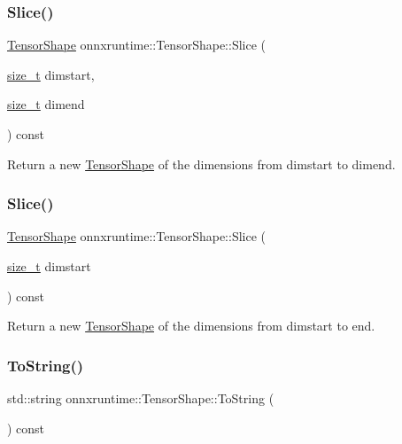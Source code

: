 \subsubsection{\texorpdfstring{Slice()}{Slice()}\hspace{0.1cm}{\footnotesize\ttfamily [1/2]}}
{\footnotesize\ttfamily \mbox{\hyperlink{classonnxruntime_1_1TensorShape}{Tensor\+Shape}} onnxruntime\+::\+Tensor\+Shape\+::\+Slice (\begin{DoxyParamCaption}\item[{\mbox{\hyperlink{mlasi_8h_a503efbc1c6e50825320ad909366b78ab}{size\+\_\+t}}}]{dimstart,  }\item[{\mbox{\hyperlink{mlasi_8h_a503efbc1c6e50825320ad909366b78ab}{size\+\_\+t}}}]{dimend }\end{DoxyParamCaption}) const}

Return a new \mbox{\hyperlink{classonnxruntime_1_1TensorShape}{Tensor\+Shape}} of the dimensions from dimstart to dimend. \mbox{\label{classonnxruntime_1_1TensorShape_aa4a71819ef5121d26e404e2efd022623}} 
\subsubsection{\texorpdfstring{Slice()}{Slice()}\hspace{0.1cm}{\footnotesize\ttfamily [2/2]}}
{\footnotesize\ttfamily \mbox{\hyperlink{classonnxruntime_1_1TensorShape}{Tensor\+Shape}} onnxruntime\+::\+Tensor\+Shape\+::\+Slice (\begin{DoxyParamCaption}\item[{\mbox{\hyperlink{mlasi_8h_a503efbc1c6e50825320ad909366b78ab}{size\+\_\+t}}}]{dimstart }\end{DoxyParamCaption}) const}

Return a new \mbox{\hyperlink{classonnxruntime_1_1TensorShape}{Tensor\+Shape}} of the dimensions from dimstart to end. \mbox{\label{classonnxruntime_1_1TensorShape_a3e0292984f1378d4b6c8bf58550da147}} 
\subsubsection{\texorpdfstring{To\+String()}{ToString()}}
{\footnotesize\ttfamily std\+::string onnxruntime\+::\+Tensor\+Shape\+::\+To\+String (\begin{DoxyParamCaption}{ }\end{DoxyParamCaption}) const}

